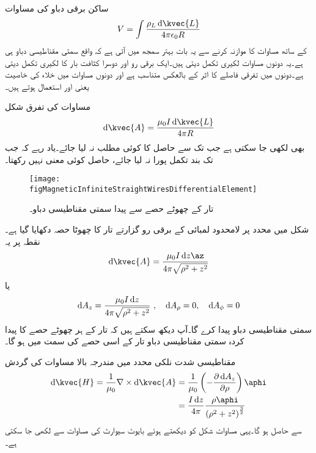 ساکن برقی دباو کی مساوات
\begin{align*}
V=\int \frac{\rho_L \dif \kvec{L}}{4\pi \epsilon_0 R}
\end{align*}
کے ساتھ مساوات کا موازنہ کرنے سے یہ بات بہتر سمجھ میں آتی ہے کہ  واقع سمتی مقناطیسی دباو ہی ہے۔یہ دونوں مساوات لکیری تکمل دیتی ہیں۔ایک برقی رو اور دوسرا کثافت بار کا لکیری تکمل دیتی ہے۔دونوں میں تفرقی فاصلے  کا اثر  کے بالعکس متناسب ہے اور دونوں مساوات میں خلاء کی خاصیت یعنی  اور  استعمال ہوتے ہیں۔

مساوات  کی تفرق شکل
\begin{align}\label{مساوات_مقناطیسی_سمتی_دباو_تفرق_شکل}
\dif \kvec{A}=\frac{\mu_0 I \dif \kvec{L}}{4\pi R}
\end{align}
بھی لکھی جا سکتی ہے جب تک  سے حاصل  کا کوئی مطلب نہ لیا جائے۔یاد رہے کہ جب تک بند تکمل پورا نہ لیا جائے، حاصل  کوئی معنی نہیں رکھتا۔
\begin{figure}
\centering
\texttt{[image: figMagneticInfiniteStraightWiresDifferentialElement]}
\caption{تار کے چھوٹے حصے سے پیدا سمتی مقناطیسی دباو۔}
\label{شکل_مقناطیسی_سمتی_مقناطیسی_دباو_تفرق_حصہ}
\end{figure}

شکل  میں  محدد پر لامحدود لمبائی کے برقی رو گزارتے تار کا چھوٹا حصہ  دکھایا گیا ہے۔نقطہ  پر یہ
\begin{align*}
\dif \kvec{A}=\frac{\mu_0 I \dif z \az}{4\pi \sqrt{\rho^2+z^2}}
\end{align*}
یا
\begin{align}
\dif  A_z=\frac{\mu_0 I \dif z}{4\pi \sqrt{\rho^2+z^2}} \,\, , \quad \dif A_\rho=0, \quad \dif A_\phi=0
\end{align}
سمتی مقناطیسی دباو پیدا کرے گا۔آپ دیکھ سکتے ہیں کہ تار کے ہر چھوٹے حصے کا پیدا کردہ سمتی مقناطیسی دباو تار کے اسی حصے کی سمت میں ہو گا۔

مقناطیسی شدت  نلکی محدد میں مندرجہ بالا مساوات کی گردش
\begin{align*}
\dif \kvec{H}=\frac{1}{\mu_0} \nabla \times \dif \kvec{A}&=\frac{1}{\mu_0} \left(-\frac{\partial \dif A_z}{\partial \rho} \right)\aphi\\
&=\frac{I \dif z}{4\pi} \frac{\rho \aphi}{\left(\rho^2+z^2 \right)^{\frac{3}{2}}}
\end{align*}
 سے حاصل ہو گا۔یہی مساوات شکل  کو دیکھتے ہوئے بایوٹ سیوارٹ کی مساوات سے لکھی جا سکتی ہے۔

